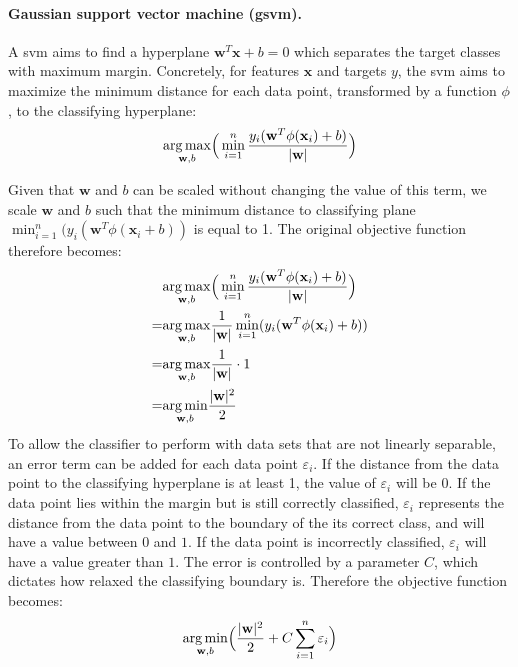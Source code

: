 \paragraph{Gaussian support vector machine (\gls{gsvm}).}
A \gls{svm} aims to find a hyperplane $\mathbf{w}^T\mathbf{x}+b=0$ which separates the target classes with maximum margin. Concretely, for features $\mathbf{x}$ and targets $y$, the \gls{svm} aims to maximize the minimum distance for each data point, transformed by a function $\phi$, to the classifying hyperplane:
\begin{equation} \label{dist}
    \underset{\mathbf{w},b}{\operatorname{arg\,max}}\Big(\min_{i=1}^{n}\frac{y_i(\mathbf{w}^T\phi(\mathbf{x}_i)+b)}{|\mathbf{w}|}\Big)
\end{equation}
 
Given that $\mathbf{w}$ and $b$ can be scaled without changing the value of this term, we scale $\mathbf{w}$ and $b$ such that the minimum distance to classifying plane $\min_{i=1}^n(y_i(\mathbf{w}^T\phi(\mathbf{x}_i + b))$ is equal to 1. The original objective function therefore becomes:
\begin{align*}
    &\underset{\mathbf{w},b}{\operatorname{arg\,max}}\Big(\min_{i=1}^{n}\frac{y_i(\mathbf{w}^T\phi(\mathbf{x}_i)+b)}{|\mathbf{w}|}\Big) \\
    =&\underset{\mathbf{w},b}{\operatorname{arg\,max}}\frac{1}{|\mathbf{w}|}\min_{i=1}^{n}(y_i(\mathbf{w}^T\phi(\mathbf{x}_i)+b)) \\
    =&\underset{\mathbf{w},b}{\operatorname{arg\,max}}\frac{1}{|\mathbf{w}|} \cdot 1 \\
    =&\underset{\mathbf{w},b}{\operatorname{arg\,min}}\frac{|\mathbf{w}|^2}{2}
\end{align*}
To allow the classifier to perform with data sets that are not linearly separable, an error term can be added for each data point $\varepsilon_i$.
If the distance from the data point to the classifying hyperplane is at least 1, the value of $\varepsilon_i$ will be $0$. If the data point lies within the margin but is still correctly classified, $\varepsilon_i$ represents the distance from the data point to the boundary of the its correct class, and will have a value between $0$ and $1$. If the data point is incorrectly classified, $\varepsilon_i$ will have a value greater than $1$. The error is controlled by a parameter $C$, which dictates how relaxed the classifying boundary is. Therefore the objective function becomes:
\begin{equation*}
    \underset{\mathbf{w},b}{\operatorname{arg\,min}}\Big(\frac{|\mathbf{w}|^2}{2} + C\sum_{i=1}^n \varepsilon_i\Big)
\end{equation*}
